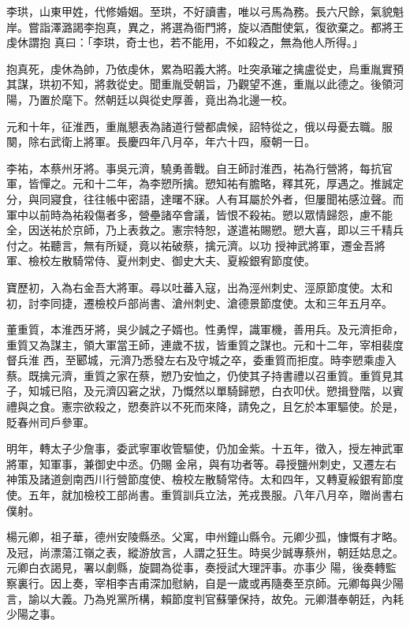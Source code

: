 \begin{pinyinscope}
 李珙，山東甲姓，代修婚姻。至珙，不好讀書，唯以弓馬為務。長六尺餘，氣貌魁岸。嘗詣澤潞謁李抱真，異之，將選為衙門將，旋以酒酣使氣，復欲棄之。都將王虔休謂抱
 真曰：「李珙，奇士也，若不能用，不如殺之，無為他人所得。」



 抱真死，虔休為帥，乃依虔休，累為昭義大將。吐突承璀之擒盧從史，烏重胤實預其謀，珙初不知，將救從史。聞重胤受朝旨，乃觀望不進，重胤以此德之。後領河陽，乃置於麾下。然朝廷以與從史厚善，竟出為北邊一校。



 元和十年，征淮西，重胤懇表為諸道行營都虞候，詔特從之，俄以母憂去職。服闋，除右武衛上將軍。長慶四年八月卒，年六十四，廢朝一日。



 李祐，本蔡州牙將。事吳元濟，驍勇善戰。自王師討淮西，祐為行營將，每抗官軍，皆憚之。元和十二年，為李愬所擒。愬知祐有膽略，釋其死，厚遇之。推誠定分，與同寢食，往往帳中密語，達曙不寐。人有耳屬於外者，但屢聞祐感泣聲。而軍中以前時為祐殺傷者多，營壘諸卒會議，皆恨不殺祐。愬以眾情歸怨，慮不能全，因送祐於京師，乃上表救之。憲宗特恕，遂遣祐賜愬。愬大喜，即以三千精兵付之。祐聽言，無有所疑，竟以祐破蔡，擒元濟。以功
 授神武將軍，遷金吾將軍、檢校左散騎常侍、夏州刺史、御史大夫、夏綏銀宥節度使。



 寶歷初，入為右金吾大將軍。尋以吐蕃入寇，出為涇州刺史、涇原節度使。太和初，討李同捷，遷檢校戶部尚書、滄州刺史、滄德景節度使。太和三年五月卒。



 董重質，本淮西牙將，吳少誠之子婿也。性勇悍，識軍機，善用兵。及元濟拒命，重質又為謀主，領大軍當王師，連歲不拔，皆重質之謀也。元和十二年，宰相裴度督兵淮
 西，至郾城，元濟乃悉發左右及守城之卒，委重質而拒度。時李愬乘虛入蔡。既擒元濟，重質之家在蔡，愬乃安恤之，仍使其子持書禮以召重質。重質見其子，知城已陷，及元濟囚窘之狀，乃慨然以單騎歸愬，白衣叩伏。愬揖登階，以賓禮與之食。憲宗欲殺之，愬奏許以不死而來降，請免之，且乞於本軍驅使。於是，貶春州司戶參軍。



 明年，轉太子少詹事，委武寧軍收管驅使，仍加金紫。十五年，徵入，授左神武軍將軍，知軍事，兼御史中丞。仍賜
 金帛，與有功者等。尋授鹽州刺史，又遷左右神策及諸道劍南西川行營節度使、檢校左散騎常侍。太和四年，又轉夏綏銀宥節度使。五年，就加檢校工部尚書。重質訓兵立法，羌戎畏服。八年八月卒，贈尚書右僕射。



 楊元卿，祖子華，德州安陵縣丞。父寓，申州鐘山縣令。元卿少孤，慷慨有才略。及冠，尚漂蕩江嶺之表，縱游放言，人謂之狂生。時吳少誠專蔡州，朝廷姑息之。元卿白衣謁見，署以劇縣，旋闢為從事，奏授試大理評事。亦事少
 陽，後奏轉監察裏行。因上奏，宰相李吉甫深加慰納，自是一歲或再隨奏至京師。元卿每與少陽言，諭以大義。乃為兇黨所構，賴節度判官蘇肇保持，故免。元卿潛奉朝廷，內耗少陽之事。




\end{pinyinscope}
